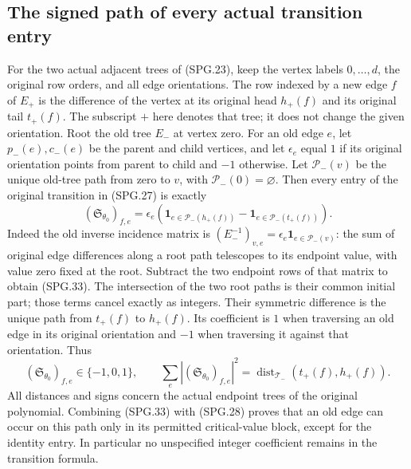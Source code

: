 \subsection{The signed path of every actual transition entry}

For the two actual adjacent trees of (SPG.23), keep the vertex labels
\(0,\ldots,d\), the original row orders, and all edge orientations.
The row indexed by a new edge \(f\) of \(E_+\) is the difference
of the vertex at its original head \(h_+(f)\) and its original tail
\(t_+(f)\). The subscript \(+\) here denotes that tree; it does
not change the given orientation. Root the old tree \(E_-\) at
vertex zero. For an old edge \(e\), let \(p_-(e),c_-(e)\) be
the parent and child vertices, and let \(\epsilon_e\) equal \(1\)
if its original orientation points from parent to child and \(-1\)
otherwise. Let \(\mathcal P_-(v)\) be the unique old-tree path
from zero to \(v\), with \(\mathcal P_-(0)=\varnothing\).
Then every entry of the original transition in (SPG.27) is exactly
\[
 (\mathfrak S_{\theta_0})_{f,e}
   =\epsilon_e\left(
       \mathbf1_{e\in\mathcal P_-(h_+(f))}
        -\mathbf1_{e\in\mathcal P_-(t_+(f))}\right).
 \tag{SPG.33}\label{eq:spg-signed-path}
\]
Indeed the old inverse incidence matrix is
\((E_-^{-1})_{v,e}=\epsilon_e\mathbf1_{e\in\mathcal P_-(v)}\):
the sum of original edge differences along a root path telescopes
to its endpoint value, with value zero fixed at the root. Subtract
the two endpoint rows of that matrix to obtain (SPG.33). The
intersection of the two root paths is their common initial part;
those terms cancel exactly as integers. Their symmetric difference
is the unique path from \(t_+(f)\) to \(h_+(f)\). Its coefficient
is \(1\) when traversing an old edge in its original orientation
and \(-1\) when traversing it against that orientation. Thus
\[
 (\mathfrak S_{\theta_0})_{f,e}\in\{-1,0,1\},\qquad
 \sum_e |(\mathfrak S_{\theta_0})_{f,e}|^2
   =\operatorname{dist}_{\mathcal T_-}(t_+(f),h_+(f)).
 \tag{SPG.34}\label{eq:spg-path-count}
\]
All distances and signs concern the actual endpoint trees of the
original polynomial. Combining (SPG.33) with (SPG.28) proves that
an old edge can occur on this path only in its permitted
critical-value block, except for the identity entry. In particular
no unspecified integer coefficient remains in the transition formula.

